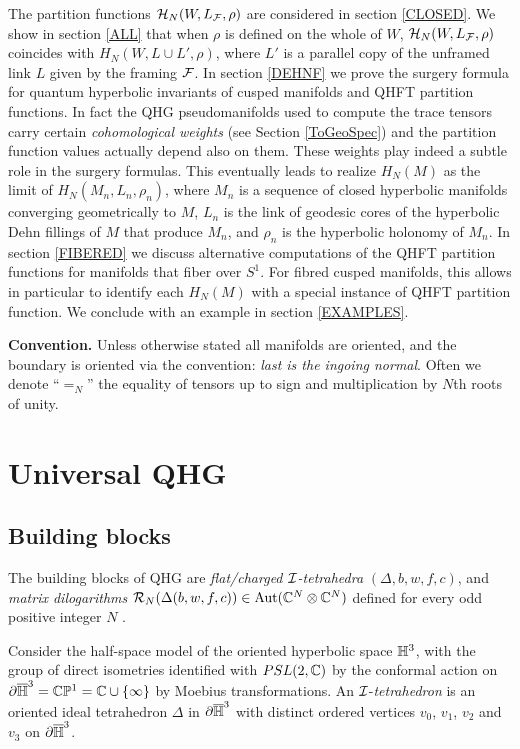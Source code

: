 The partition functions ${\mathcal H}_N(W,L_{\mathcal F},\rho)$ are considered in
section \ref{CLOSED}.  We show in section \ref{ALL} that when $\rho$
is defined on the whole of $W$, ${\mathcal H}_N(W,L_{\mathcal F},\rho)$ coincides with
$H_N(W,L\cup L',\rho)$, where $L'$ is a parallel copy of the unframed
link $L$ given by the framing ${\mathcal F}$. In section \ref{DEHNF} we prove
the surgery formula for quantum hyperbolic invariants of cusped
manifolds and QHFT partition functions. In fact the QHG
pseudomanifolds used to compute the trace tensors carry certain
{\it cohomological weights} (see Section \ref{ToGeoSpec}) and the 
partition function values actually depend also on them. These weights
play indeed a subtle role in the surgery formulas.  This eventually
leads to realize $H_N(M)$ as the limit of $H_N(M_n,L_n,\rho_n)$, where
$M_n$ is a sequence of closed hyperbolic manifolds converging
geometrically to $M$, $L_n$ is the link of geodesic cores of the
hyperbolic Dehn fillings of $M$ that produce $M_n$, and $\rho_n$ is
the hyperbolic holonomy of $M_n$.  In section \ref{FIBERED} we discuss
alternative computations of the QHFT partition functions for manifolds
that fiber over $S^1$.  For fibred cusped manifolds, this allows in
particular to identify each $H_N(M)$ with a special instance of QHFT
partition function. We conclude with an example in section
\ref{EXAMPLES}.
\medskip

{\bf Convention.}  Unless otherwise stated all manifolds are oriented,
and the boundary is oriented via the convention: {\it last is the
  ingoing normal}. Often we denote ``$=_N$'' the equality of tensors
up to sign and multiplication by $N$th roots of unity.

\section{Universal QHG}\label{QHG}

\subsection{Building blocks}\label{buildbox} The building blocks of 
QHG are {\it flat/charged ${\mathcal I}$-tetrahedra} $(\Delta,b,w,f,c)$, and
{\it matrix dilogarithms} ${\mathcal R}_N(\Delta(b,w,f,c)) \in {\rm Aut}(\mathbb{C}^N
\otimes \mathbb{C}^N)$ defined for every odd positive integer $N$ \cite{BB2}.


\medskip

 Consider the half-space
model of the oriented hyperbolic space $\mathbb{H}^3$, with the group of
direct isometries identified with $PSL(2,{\mathbb C})$ by the conformal action
on $\partial \overline {\mathbb{H}}^3= \mathbb{C}\mathbb{P}^1 = {\mathbb C} \cup\{ \infty \}$
by Moebius transformations. An ${\mathcal I}$-{\it tetrahedron} is an oriented
ideal tetrahedron $\Delta$ in $\partial \overline{\mathbb{H}}^3$ with distinct
ordered vertices $v_0$, $v_1$, $v_2$ and $v_3$ on $\partial
\overline{\mathbb{H}}^3$.

